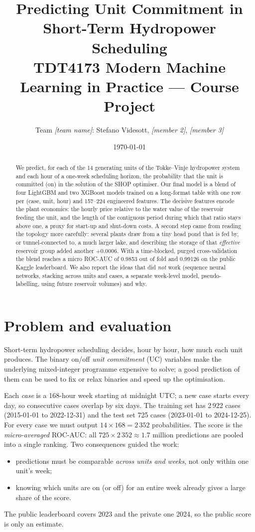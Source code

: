 \documentclass[11pt,a4paper]{article}
\title{Predicting Unit Commitment in Short-Term Hydropower Scheduling\\[2pt]
\large TDT4173 Modern Machine Learning in Practice --- Course Project}
\author{Team \textit{[team name]}: Stefano Videsott, \textit{[member 2]}, \textit{[member 3]}}
\date{\today}
\begin{document}
\maketitle

\begin{abstract}
We predict, for each of the 14 generating units of the Tokke--Vinje hydropower system and each hour of a
one-week scheduling horizon, the probability that the unit is committed (on) in the solution of the SHOP
optimiser. Our final model is a blend of four LightGBM and two XGBoost models trained on a long-format table
with one row per (case, unit, hour) and 157--224 engineered features. The decisive features encode the plant
economics: the hourly price relative to the water value of the reservoir feeding the unit, and the length of
the contiguous period during which that ratio stays above one, a proxy for start-up and shut-down costs.
A second step came from reading the topology more carefully: several plants draw from a tiny head pond that is
fed by, or tunnel-connected to, a much larger lake, and describing the storage of that \emph{effective}
reservoir group added another $+0.0006$. With a time-blocked, purged cross-validation the blend reaches a
micro ROC-AUC of 0.9853 out of fold and 0.99126 on the public Kaggle leaderboard. We also report the ideas
that did \emph{not} work (sequence neural networks, stacking across units and cases, a separate week-level
model, pseudo-labelling, using future reservoir volumes) and why.
\end{abstract}

\section{Problem and evaluation}
Short-term hydropower scheduling decides, hour by hour, how much each unit produces. The binary on/off
\emph{unit commitment} (UC) variables make the underlying mixed-integer programme expensive to solve; a good
prediction of them can be used to fix or relax binaries and speed up the optimisation.

Each \emph{case} is a 168-hour week starting at midnight UTC; a new case starts every day, so consecutive
cases overlap by six days. The training set has 2\,922 cases (2015-01-01 to 2022-12-31) and the test set
725 cases (2023-01-01 to 2024-12-25). For every case we must output $14 \times 168 = 2\,352$ probabilities.
The score is the \emph{micro-averaged} ROC-AUC: all $725 \times 2\,352 \approx 1.7$ million predictions are
pooled into a single ranking. Two consequences guided the work:
\begin{itemize}
  \item predictions must be comparable \emph{across units and weeks}, not only within one unit's week;
  \item knowing which units are on (or off) for an entire week already gives a large share of the score.
\end{itemize}
The public leaderboard covers 2023 and the private one 2024, so the public score is only an estimate.
\end{document}
